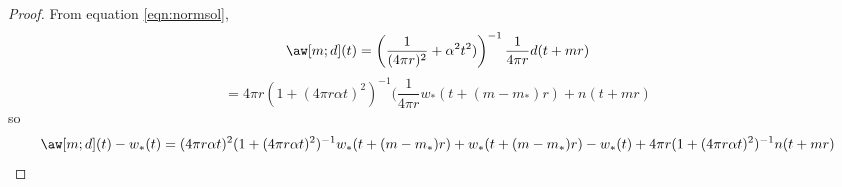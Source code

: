 \begin{proof}
  From equation \ref{eqn:normsol},
  \[
    \aw[m;d](t) = 
    \left(\frac{1}{(4\pi r)^2} + \alpha^2 t^2)\right)^{-1}\frac{1}{4 \pi r}d(t+mr)
  \]
  \[
    =4\pi r(1 + (4\pi r \alpha t)^2)^{-1} (\frac{1}{4\pi r}
    w_*(t+(m-m_*)r) + n(t+mr) 
  \]
  so
  \begin{equation}
    \label{eqn:wres}
    \aw[m;d](t) - w_*(t) = (4\pi r \alpha t)^2 (1+ (4\pi r \alpha t)^2)^{-1}w_*(t+(m-m_*)r)
    +w_*(t+(m-m_*)r)-w_*(t) + 4 \pi r (1 + (4\pi r \alpha t)^2)^{-1}n(t+mr)
  \end{equation}
\end{proof}

